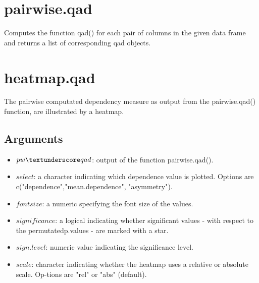 \documentclass{scrartcl}\usepackage[]{graphicx}\usepackage[]{color}
\begin{document}
\section{pairwise.qad}
Computes the function qad() for each pair of columns in the given data frame and returns a list of corresponding qad objects.

\section{heatmap.qad}
The pairwise computated dependency measure as output from the pairwise.qad() function, are illustrated by a heatmap.

\subsection{Arguments}

\begin{itemize}
  \item $pw\textunderscore qad$: output of the function pairwise.qad().
  \item $select$: a character indicating which dependence value is plotted. Options are c("dependence","mean.dependence", "asymmetry").
  \item $fontsize$: a numeric specifying the font size of the values.
  \item $significance$: a logical indicating whether significant values - with respect to the permutatedp.values - are marked with a star.
  \item $sign.level$: numeric value indicating the significance level.
  \item $scale$: character indicating whether the heatmap uses a relative or absolute scale.  Op-tions are "rel" or "abs" (default).
\end{itemize}
\end{document}
